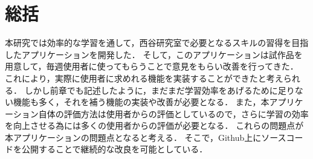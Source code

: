 
\chapter{総括}\label{ux7dcfux62ec}

本研究では効率的な学習を通して，西谷研究室で必要となるスキルの習得を目指したアプリケーションを開発した．
そして，このアプリケーションは試作品を用意して，毎週使用者に使ってもらうことで意見をもらい改善を行ってきた．
これにより，実際に使用者に求めれる機能を実装することができたと考えられる．
しかし前章でも記述したように，まだまだ学習効率をあげるために足りない機能も多く，それを補う機能の実装や改善が必要となる．
また，本アプリケーション自体の評価方法は使用者からの評価としているので，さらに学習の効率を向上させる為には多くの使用者からの評価が必要となる．
これらの問題点が本アプリケーションの問題点となると考える．
そこで，Github上にソースコードを公開することで継続的な改良を可能としている\cite{ドットラーニング}．
